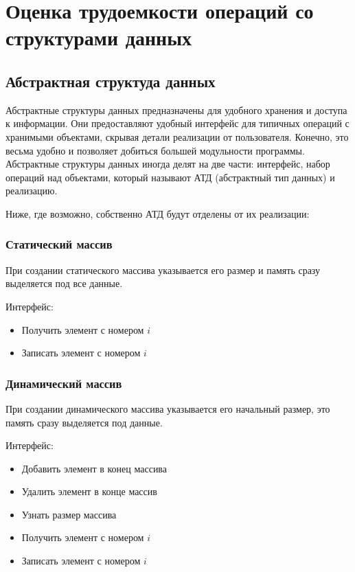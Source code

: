 \section{Оценка трудоемкости операций со структурами данных}
\subsection{Абстрактная структуда данных}
Абстрактные структуры данных предназначены для удобного хранения и доступа к информации.
Они предоставляют удобный интерфейс для типичных операций с хранимыми объектами, скрывая детали реализации от пользователя.
Конечно, это весьма удобно и позволяет добиться большей модульности программы.
Абстрактные структуры данных иногда делят на две части:
интерфейс, набор операций над объектами, который называют АТД (абстрактный тип данных) и реализацию.

Ниже, где возможно, собственно АТД будут отделены от их реализации:

\subsubsection*{Статический массив}
При создании статического массива указывается его размер и память сразу выделяется под все данные.

Интерфейс:
\begin{itemize}
    \item Получить элемент с номером $i$
    \item Записать элемент с номером $i$
\end{itemize}

\subsubsection*{Динамический массив}
При создании динамического массива указывается его начальный размер, это память сразу выделяется под данные.

Интерфейс:
\begin{itemize}
    \item Добавить элемент в конец массива
    \item Удалить элемент в конце массив
    \item Узнать размер массива
    \item Получить элемент с номером $i$
    \item Записать элемент с номером $i$
\end{itemize}

